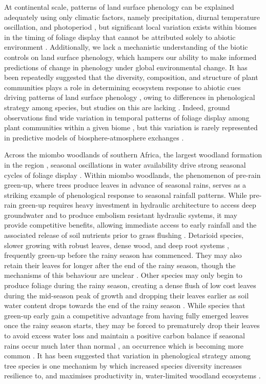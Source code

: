 \documentclass[11pt,a4paper]{article}
\begin{document}
At continental scale, patterns of land surface phenology can be explained
adequately using only climatic factors, namely precipitation, diurnal
temperature oscillation, and photoperiod \citep{Adole2018b, Adole2019,
Guan2014}, but significant local variation exists within biomes in the timing
of foliage display that cannot be attributed solely to abiotic environment
\citep{Stockli2011}. Additionally, we lack a mechanistic understanding of the
biotic controls on land surface phenology, which hampers our ability to make
informed predictions of change in phenology under global environmental change.
It has been repeatedly suggested that the diversity, composition, and structure
of plant communities plays a role in determining ecosystem response to abiotic
cues driving patterns of land surface phenology \citep{Adole2018a,
Jeganathan2014, Fuller1999}, owing to differences in phenological strategy
among species, but studies on this are lacking \citep{Ma2022}. Indeed, ground
observations find wide variation in temporal patterns of foliage display among
plant communities within a given biome \citep{Seyednasrollah2019}, but this
variation is rarely represented in predictive models of biosphere-atmosphere
exchanges \citep{Scheiter2013, Pavlick2013}.

Across the miombo woodlands of southern Africa, the largest woodland formation
in the region \citep{White1983}, seasonal oscillations in water availability
drive strong seasonal cycles of foliage display \citep{Chidumayo2001,
Dahlin2016}. Within miombo woodlands, the phenomenon of pre-rain green-up,
where trees produce leaves in advance of seasonal rains, serves as a striking
example of phenological response to seasonal rainfall patterns. While pre-rain
green-up requires heavy investment in hydraulic architecture to access deep
groundwater and to produce embolism resistant hydraulic systems, it may provide
competitive benefits, allowing immediate access to early rainfall and the
associated release of soil nutrients prior to grass flushing \citep{Ryan2017,
February2016}. Detarioid species, slower growing with robust leaves, dense
wood, and deep root systems \citep{Zhou2020, Timberlake1993}, frequently
green-up before the rainy season has commenced. They may also retain their
leaves for longer after the end of the rainy season, though the mechanisms of
this behaviour are unclear \citep{Giraldo2011, Kushwaha2011}. Other species may
only begin to produce foliage during the rainy season, creating a dense flush
of low cost leaves during the mid-season peak of growth and dropping their
leaves earlier as soil water content drops towards the end of the rainy season
\citep{Lasky2016}. While species that green-up early gain a competitive
advantage from having fully emerged leaves once the rainy season starts, they
may be forced to prematurely drop their leaves to avoid excess water loss and
maintain a positive carbon balance if seasonal rains occur much later than
normal \citep{Vinya2018}, an occurrence which is becoming more common
\citep{Wainwright2021}. It has been suggested that variation in phenological
strategy among tree species is one mechanism by which increased species
diversity increases resilience to, and maximises productivity in, water-limited
woodland ecosystems \citep{Stan2019, Morellato2016}. 
\end{document}
